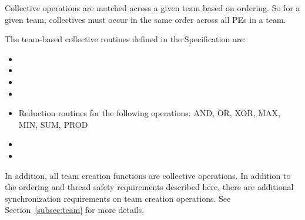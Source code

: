 {Collective operations are matched across a given team based on ordering. So for a given team,
collectives must occur in the same order across all PEs in a team.

The team-based collective routines defined in the \openshmem Specification are:

\begin{itemize}
\item {}
\item {}
\item {}
\item {}
\item Reduction routines for the following operations: AND, OR, XOR, MAX, MIN, SUM, PROD
\item {}
\item {}
\end{itemize}

In addition, all team creation functions are collective operations. In addition to the ordering
and thread safety requirements described here, there are additional synchronization requirements
on team creation operations. See Section~\ref{subsec:team} for more details.
}


